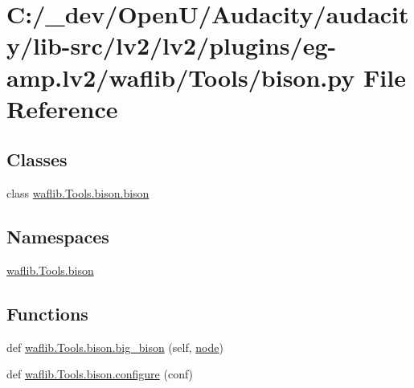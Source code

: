 \hypertarget{lv2_2plugins_2eg-amp_8lv2_2waflib_2_tools_2bison_8py}{}\section{C\+:/\+\_\+dev/\+Open\+U/\+Audacity/audacity/lib-\/src/lv2/lv2/plugins/eg-\/amp.lv2/waflib/\+Tools/bison.py File Reference}
\label{lv2_2plugins_2eg-amp_8lv2_2waflib_2_tools_2bison_8py}
\subsection*{Classes}
\begin{DoxyCompactItemize}
\item 
class \hyperlink{classwaflib_1_1_tools_1_1bison_1_1bison}{waflib.\+Tools.\+bison.\+bison}
\end{DoxyCompactItemize}
\subsection*{Namespaces}
\begin{DoxyCompactItemize}
\item 
 \hyperlink{namespacewaflib_1_1_tools_1_1bison}{waflib.\+Tools.\+bison}
\end{DoxyCompactItemize}
\subsection*{Functions}
\begin{DoxyCompactItemize}
\item 
def \hyperlink{namespacewaflib_1_1_tools_1_1bison_ab34716254c6b552f235c340bad47b596}{waflib.\+Tools.\+bison.\+big\+\_\+bison} (self, \hyperlink{structnode}{node})
\item 
def \hyperlink{namespacewaflib_1_1_tools_1_1bison_af8585015f181d6117510d086dd42623a}{waflib.\+Tools.\+bison.\+configure} (conf)
\end{DoxyCompactItemize}
